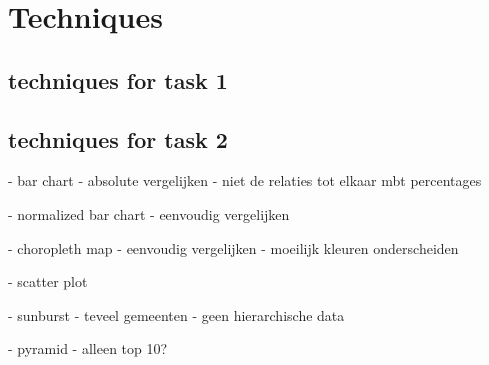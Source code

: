 \section{Techniques}

\subsection{techniques for task 1}

\subsection{techniques for task 2}
- bar chart
 - absolute vergelijken
 - niet de relaties tot elkaar mbt percentages
 
- normalized bar chart
 - eenvoudig vergelijken
 
- choropleth map
 - eenvoudig vergelijken
 - moeilijk kleuren onderscheiden
 
- scatter plot

- sunburst
 - teveel gemeenten
 - geen hierarchische data

- pyramid
 - alleen top 10?
 
 

